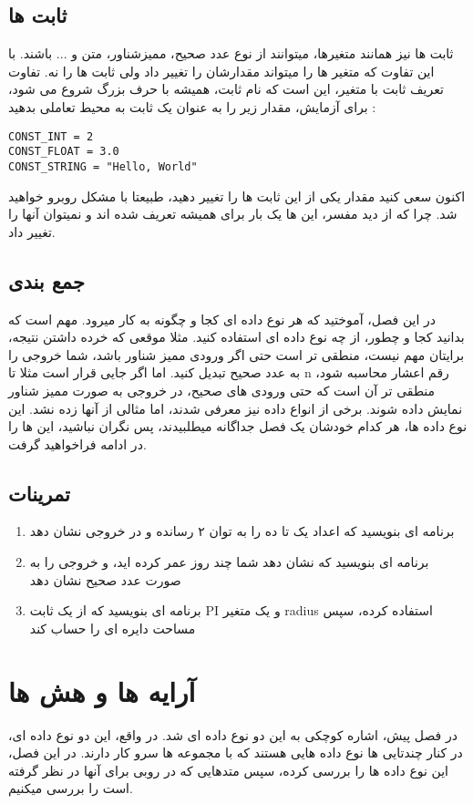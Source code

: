 \documentclass[11pt]{article}
\begin{document}
\subsection{ثابت ها}
ثابت ها نیز همانند متغیرها، میتوانند از نوع عدد صحیح، ممیزشناور، متن و ... باشند. با این تفاوت که متغیر ها را میتواند مقدارشان را تغییر داد ولی ثابت ها را نه. تفاوت تعریف ثابت با متغیر، این است که نام ثابت، همیشه با حرف بزرگ شروع می شود، برای آزمایش، مقدار زیر را به عنوان یک ثابت به محیط تعاملی بدهید :
\begin{latin}
\begin{verbatim}
CONST_INT = 2
CONST_FLOAT = 3.0
CONST_STRING = "Hello, World"
\end{verbatim}
\end{latin}
اکنون سعی کنید مقدار یکی از این ثابت ها را تغییر دهید، طبیعتا با مشکل روبرو خواهید شد. چرا که از دید مفسر، این ها یک بار برای همیشه تعریف شده اند و نمیتوان آنها را تغییر داد. 

\subsection{جمع بندی}
در این فصل، آموختید که هر نوع داده ای کجا و چگونه به کار میرود. مهم است که بدانید کجا و چطور، از چه نوع داده ای استفاده کنید. مثلا موقعی که خرده داشتن نتیجه، برایتان مهم نیست، منطقی تر است حتی اگر ورودی ممیز شناور باشد، شما خروجی را به عدد صحیح تبدیل کنید. اما اگر جایی قرار است مثلا تا n رقم اعشار محاسبه شود، منطقی تر آن است که حتی ورودی های صحیح، در خروجی به صورت ممیز شناور نمایش داده شوند. برخی از انواع داده نیز معرفی شدند، اما مثالی از آنها زده نشد. این نوع داده ها، هر کدام خودشان یک فصل جداگانه میطلبیدند، پس نگران نباشید، این ها را در ادامه فراخواهید گرفت.
\subsection{تمرینات}
\begin{enumerate}
\item برنامه ای بنویسید که اعداد یک تا ده را به توان ۲ رسانده و در خروجی نشان دهد
\item برنامه ای بنویسید که نشان دهد شما چند روز عمر کرده اید، و خروجی را به صورت عدد صحیح نشان دهد
\item برنامه ای بنویسید که از یک ثابت PI و یک متغیر radius استفاده کرده، سپس مساحت دایره ای را حساب کند
\end{enumerate}
\newpage{}
\section{آرایه ها و هش ها}
در فصل پیش، اشاره کوچکی به این دو نوع داده ای شد. در واقع، این دو نوع داده ای، در کنار چندتایی ها
نوع داده هایی هستند که با مجموعه ها سرو کار دارند. در این فصل، این نوع داده ها را بررسی کرده، سپس متدهایی که در روبی برای آنها در نظر گرفته است را بررسی میکنیم. 
\end{document}
